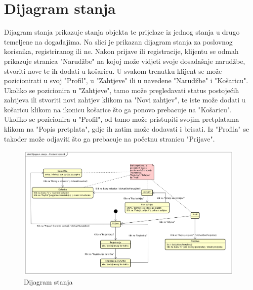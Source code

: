 		\section{Dijagram stanja}
			Dijagram stanja prikazuje stanja objekta te prijelaze iz jednog stanja u drugo temeljene na događajima. Na slici je prikazan dijagram stanja za poslovnog korisnika, registriranog ili ne. Nakon prijave ili registracije, klijentu se odmah prikazuje stranica "Narudžbe" na kojoj može vidjeti svoje dosadašnje narudžbe, stvoriti nove te ih dodati u košaricu. U svakom trenutku klijent se može pozicionirati u svoj "Profil", u "Zahtjeve" ili u navedene "Narudžbe" i "Košaricu". Ukoliko se pozicionira u "Zahtjeve", tamo može pregledavati status postojećih zahtjeva ili stvoriti novi zahtjev klikom na "Novi zahtjev", te iste može dodati u košaricu klikom na ikonicu košarice što ga ponovo prebacuje na "Košaricu". Ukoliko se pozicionira u "Profil", od tamo može pristupiti svojim pretplatama klikom na "Popis pretplata", gdje ih zatim može dodavati i brisati. Iz "Profila" se također može odjaviti što ga prebacuje na početnu stranicu "Prijave".
			\\
			\begin{figure}[H]
				\includegraphics[scale=0.4]{dijagrami/dij_stanja.PNG} 
				\centering
				\caption{Dijagram stanja}
				\label{fig:dij_stanja}%
			\end{figure}
			
			
